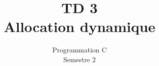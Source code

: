 \documentclass{article}
\title{TD 3\\ Allocation dynamique}
\date{Programmation C\\ Semestre 2}
\begin{document}
	\maketitle
	\section{}
		
	\section{}
		
	\section{}
		

		
\end{document}
